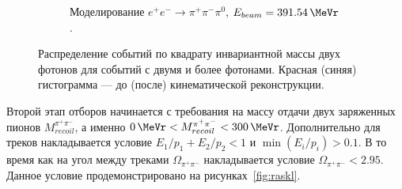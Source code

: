 \begin{figure}[htbp]
\begin{subfigure}[t]{0.45\textwidth}
        \caption{Моделирование $e^+ e^- \to \pi^+ \pi^- \pi^0$, $E_{beam} = \SI{391.54}{\MeVr}$.}
        \label{fig:diff_kf_mpi0_sim391_54}
    \end{subfigure}
    \caption{Распределение событий по квадрату инвариантной массы двух фотонов для событий с двумя и более фотонами.
    Красная (синяя) гистограмма --- до (после) кинематической реконструкции.}\label{fig:diff_kf_mpi0}
\end{figure}

 
Второй этап отборов начинается с требования на массу отдачи двух заряженных пионов $M_{recoil}^{\pi^+ \pi^-}$,
а именно $\SI{0}{\MeVr} < M_{recoil}^{\pi^+ \pi^-} < \SI{300}{\MeVr}$.
Дополнительно для треков накладывается условие
$ E_1/p_1 + E_2 / p_2 < 1$
и $\min(E_i / p_i) > 0.1$.
В то время как на угол между треками $\Omega_{\pi^+ \pi^-}$ накладывается условие $\Omega_{\pi^+ \pi^-} < 2.95$.
Данное условие продемонстрировано на рисунках~\ref{fig:raskl}.

